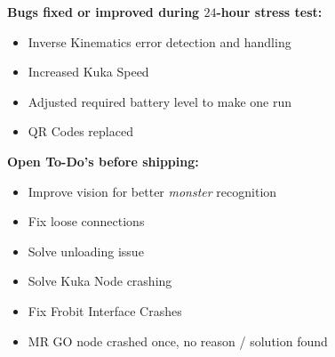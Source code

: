 \textbf{Bugs fixed or improved during $24$-hour stress test:}
\begin{itemize}
\item Inverse Kinematics error detection and handling
\item Increased Kuka Speed
\item Adjusted required battery level to make one run
\item QR Codes replaced
\end{itemize}

\textbf{Open To-Do's before shipping:}
\begin{itemize}
\item Improve vision for better \textit{monster} recognition
\item Fix loose connections
\item Solve unloading issue
\item Solve Kuka Node crashing
\item Fix Frobit Interface Crashes
\item MR GO node crashed once, no reason / solution found
\end{itemize}

